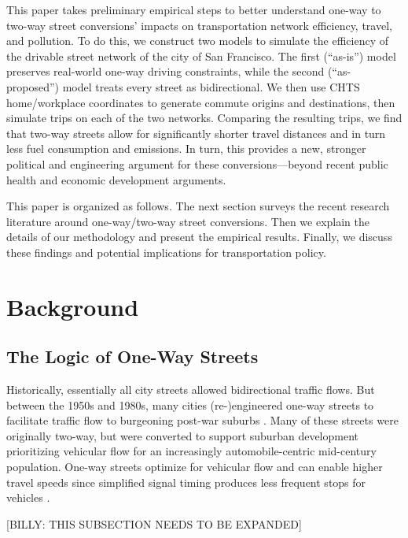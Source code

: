 \documentclass{trbunofficial}
\begin{document}
This paper takes preliminary empirical steps to better understand one-way to two-way street conversions' impacts on transportation network efficiency, travel, and pollution. To do this, we construct two models to simulate the efficiency of the drivable street network of the city of San Francisco. The first (\enquote{as-is}) model preserves real-world one-way driving constraints, while the second (\enquote{as-proposed}) model treats every street as bidirectional. We then use CHTS home/workplace coordinates to generate commute origins and destinations, then simulate trips on each of the two networks. Comparing the resulting trips, we find that two-way streets allow for significantly shorter travel distances and in turn less fuel consumption and emissions. In turn, this provides a new, stronger political and engineering argument for these conversions---beyond recent public health and economic development arguments.

This paper is organized as follows. The next section surveys the recent research literature around one-way/two-way street conversions. Then we explain the details of our methodology and present the empirical results. Finally, we discuss these findings and potential implications for transportation policy.

\section{Background}

\subsection{The Logic of One-Way Streets}

Historically, essentially all city streets allowed bidirectional traffic flows. But between the 1950s and 1980s, many cities (re-)engineered one-way streets to facilitate traffic flow to burgeoning post-war suburbs \cite{appleyard_livable_1980,hall_cities_1996,handy_planning_2003,jackson_crabgrass_1987}. Many of these streets were originally two-way, but were converted to support suburban development prioritizing vehicular flow for an increasingly automobile-centric mid-century population. One-way streets optimize for vehicular flow and can enable higher travel speeds since simplified signal timing produces less frequent stops for vehicles \cite{gayah_two-way_2012,gayah_analytical_2012}.

[BILLY: THIS SUBSECTION NEEDS TO BE EXPANDED]
\end{document}
